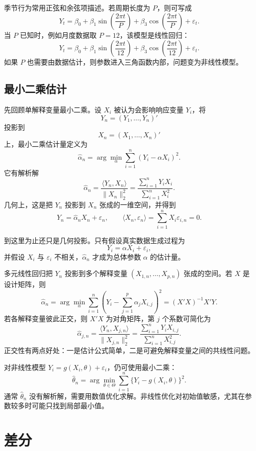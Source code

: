 \documentclass[11pt,a4paper,openany]{ctexbook}
\begin{document}
季节行为常用正弦和余弦项描述。若周期长度为 \(P\)，则可写成
\[
  Y_t=\beta_0+\beta_1\sin\left(\frac{2\pi t}{P}\right)
      +\beta_3\cos\left(\frac{2\pi t}{P}\right)+\varepsilon_t.
\]
当 \(P\) 已知时，例如月度数据取 \(P=12\)，该模型是线性回归：
\begin{equation}
  Y_t=\beta_0+\beta_1\sin\left(\frac{2\pi t}{12}\right)
      +\beta_3\cos\left(\frac{2\pi t}{12}\right)+\varepsilon_t. \tag{2.6}
\end{equation}
如果 \(P\) 也需要由数据估计，则参数进入三角函数内部，问题变为非线性模型。

\subsection{最小二乘估计}

先回顾单解释变量最小二乘。设 \(X_i\) 被认为会影响响应变量 \(Y_i\)，将
\[
  Y_n=(Y_1,\ldots,Y_n)'
\]
投影到
\[
  X_n=(X_1,\ldots,X_n)'
\]
上，最小二乘估计量定义为
\[
  \hat{\alpha}_n
  =\arg\min_\alpha \sum_{i=1}^n (Y_i-\alpha X_i)^2.
\]
它有解析解
\[
  \hat{\alpha}_n
  =\frac{\langle Y_n,X_n\rangle}{\|X_n\|_2^2}
  =\frac{\sum_{i=1}^n Y_iX_i}{\sum_{i=1}^n X_i^2}.
\]
几何上，这是把 \(Y_n\) 投影到 \(X_n\) 张成的一维空间，并得到
\[
  Y_n=\hat{\alpha}_n X_n+\varepsilon_n,
  \qquad
  \langle X_n,\varepsilon_n\rangle=\sum_{i=1}^n X_i\varepsilon_{i,n}=0.
\]

到这里为止还只是几何投影。只有假设真实数据生成过程为
\[
  Y_i=\alpha X_i+\varepsilon_i,
\]
并假设 \(X_i\) 与 \(\varepsilon_i\) 不相关，\(\hat{\alpha}_n\) 才成为总体参数 \(\alpha\) 的估计量。

多元线性回归把 \(Y_n\) 投影到多个解释变量 \((X_{1,n},\ldots,X_{p,n})\) 张成的空间。若 \(X\) 是设计矩阵，则
\[
  \hat{\alpha}_n
  =\arg\min_\alpha \sum_{i=1}^n
  \left(Y_i-\sum_{j=1}^p\alpha_jX_{i,j}\right)^2
  =(X'X)^{-1}X'Y.
\]
若各解释变量彼此正交，则 \(X'X\) 为对角矩阵，第 \(j\) 个系数可简化为
\[
  \hat{\alpha}_{j,n}
  =\frac{\langle Y_n,X_{j,n}\rangle}{\|X_{j,n}\|_2^2}
  =\frac{\sum_{i=1}^nY_iX_{i,j}}{\sum_{i=1}^nX_{i,j}^2}.
\]
正交性有两点好处：一是估计公式简单，二是可避免解释变量之间的共线性问题。

对非线性模型 \(Y_i=g(X_i,\theta)+\varepsilon_i\)，仍可使用最小二乘：
\[
  \hat{\theta}_n
  =\arg\min_{\theta\in\Theta}
  \sum_{i=1}^n\{Y_i-g(X_i,\theta)\}^2.
\]
通常 \(\hat{\theta}_n\) 没有解析解，需要用数值优化求解。非线性优化对初始值敏感，尤其在参数较多时可能只找到局部最小值。

\section{差分}
\end{document}
